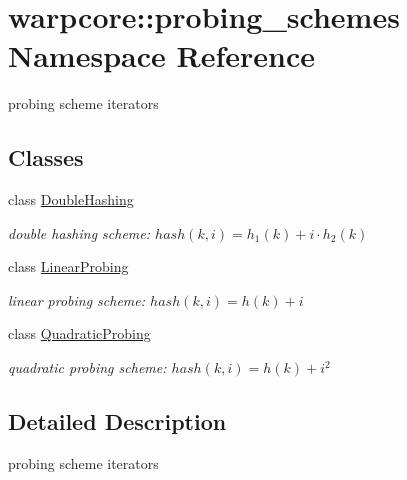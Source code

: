 \hypertarget{namespacewarpcore_1_1probing__schemes}{}\section{warpcore\+:\+:probing\+\_\+schemes Namespace Reference}
\label{namespacewarpcore_1_1probing__schemes}


probing scheme iterators  


\subsection*{Classes}
\begin{DoxyCompactItemize}
\item 
class \hyperlink{classwarpcore_1_1probing__schemes_1_1DoubleHashing}{Double\+Hashing}
\begin{DoxyCompactList}\small\item\em double hashing scheme\+: $hash(k,i) = h_1(k)+i\cdot h_2(k)$ \end{DoxyCompactList}\item 
class \hyperlink{classwarpcore_1_1probing__schemes_1_1LinearProbing}{Linear\+Probing}
\begin{DoxyCompactList}\small\item\em linear probing scheme\+: $hash(k,i) = h(k)+i$ \end{DoxyCompactList}\item 
class \hyperlink{classwarpcore_1_1probing__schemes_1_1QuadraticProbing}{Quadratic\+Probing}
\begin{DoxyCompactList}\small\item\em quadratic probing scheme\+: $hash(k,i) = h(k)+i^2$ \end{DoxyCompactList}\end{DoxyCompactItemize}


\subsection{Detailed Description}
probing scheme iterators 
